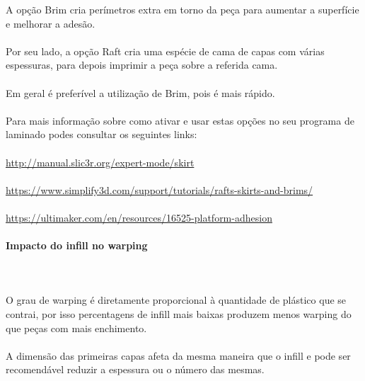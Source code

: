 \documentclass[11pt,a4paper]{article}
\begin{document}
A opção Brim cria perímetros extra em torno da peça para aumentar a superfície e melhorar a adesão.
\\\\
Por seu lado, a opção Raft cria uma espécie de cama de capas com várias espessuras, para depois imprimir a peça sobre a referida cama.
\\\\
Em geral é preferível a utilização de Brim, pois é mais rápido.
\\\\
Para mais informação sobre como ativar e usar estas opções no seu programa de laminado podes consultar os seguintes links:\\\\
\url{http://manual.slic3r.org/expert-mode/skirt}\\\\
\url{https://www.simplify3d.com/support/tutorials/rafts-skirts-and-brims/}\\\\
\url{https://ultimaker.com/en/resources/16525-platform-adhesion}
			\paragraph{Impacto do infill no warping}\mbox{}\\\\
O grau de warping é diretamente proporcional à quantidade de plástico que se contrai, por isso percentagens de infill mais baixas produzem menos warping do que peças com mais enchimento.
\\\\
A dimensão das primeiras capas afeta da mesma maneira que o infill e pode ser recomendável reduzir a espessura ou o número das mesmas.
\end{document}
